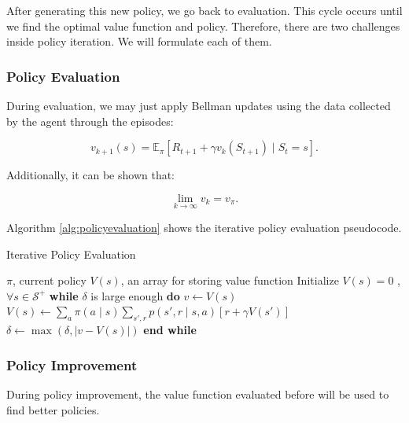 After generating this new policy, we go back to evaluation. This cycle occurs until we find the optimal value function and policy. Therefore, there are two challenges inside policy iteration. We will formulate each of them.

\subsubsection{Policy Evaluation}

During evaluation, we may just apply Bellman updates using the data collected by the agent through the episodes:

\begin{equation}
v_{k+1}(s) = \mathbb{E}_{\pi}[R_{t+1} + \gamma v_{k}(S_{t+1}) \mid S_{t} = s].
\end{equation}

Additionally, it can be shown that:

\begin{equation}
\lim_{k \rightarrow \infty} v_{k} = v_{\pi}.
\end{equation}

Algorithm \ref{alg:policyevaluation} shows the iterative policy evaluation pseudocode.

\begin{algorithm}
	\caption{Iterative Policy Evaluation}
	\begin{algorithmic}
	\REQUIRE $\pi$, current policy
	\REQUIRE $V(s)$, an array for storing value function
	\STATE Initialize $V(s) = 0$ , $\forall s \in \mathcal{S}^{+}$ 
	\STATE \textbf{while} $\delta$ is large enough \textbf{do}
	\STATE \hspace{5mm} $v \leftarrow V(s)$
	\STATE \hspace{5mm} $V(s) \leftarrow \sum_{a} \pi(a \mid s) \sum_{s',r} p(s',r \mid s,a)[r + \gamma V(s')]$
	\STATE \hspace{5mm} $\delta \leftarrow \max(\delta, \lvert v - V(s) \rvert)$
	\STATE \textbf{end while} 	
	\end{algorithmic}
	\label{alg:policyevaluation}	
\end{algorithm}

\subsubsection{Policy Improvement}

During policy improvement, the value function evaluated before will be used to find better policies.

